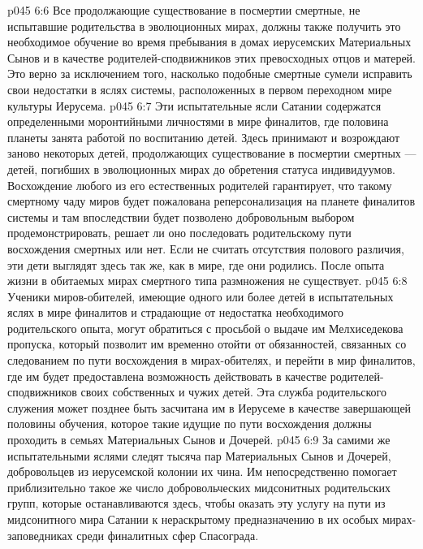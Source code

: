 \vs p045 6:6 Все продолжающие существование в посмертии смертные, не испытавшие родительства в эволюционных мирах, должны также получить это необходимое обучение во время пребывания в домах иерусемских Материальных Сынов и в качестве родителей\hyp{}сподвижников этих превосходных отцов и матерей. Это верно за исключением того, насколько подобные смертные сумели исправить свои недостатки в яслях системы, расположенных в первом переходном мире культуры Иерусема.
\vs p045 6:7 \pc Эти испытательные ясли Сатании содержатся определенными моронтийными личностями в мире финалитов, где половина планеты занята работой по воспитанию детей. Здесь принимают и возрождают заново некоторых детей, продолжающих существование в посмертии смертных --- детей, погибших в эволюционных мирах до обретения статуса индивидуумов. Восхождение любого из его естественных родителей гарантирует, что такому смертному чаду миров будет пожалована реперсонализация на планете финалитов системы и там впоследствии будет позволено добровольным выбором продемонстрировать, решает ли оно последовать родительскому пути восхождения смертных или нет. Если не считать отсутствия полового различия, эти дети выглядят здесь так же, как в мире, где они родились. После опыта жизни в обитаемых мирах смертного типа размножения не существует.
\vs p045 6:8 Ученики миров\hyp{}обителей, имеющие одного или более детей в испытательных яслях в мире финалитов и страдающие от недостатка необходимого родительского опыта, могут обратиться с просьбой о выдаче им Мелхиседекова пропуска, который позволит им временно отойти от обязанностей, связанных со следованием по пути восхождения в мирах\hyp{}обителях, и перейти в мир финалитов, где им будет предоставлена возможность действовать в качестве родителей\hyp{}сподвижников своих собственных и чужих детей. Эта служба родительского служения может позднее быть засчитана им в Иерусеме в качестве завершающей половины обучения, которое такие идущие по пути восхождения должны проходить в семьях Материальных Сынов и Дочерей.
\vs p045 6:9 За самими же испытательными яслями следят тысяча пар Материальных Сынов и Дочерей, добровольцев из иерусемской колонии их чина. Им непосредственно помогает приблизительно такое же число добровольческих мидсонитных родительских групп, которые останавливаются здесь, чтобы оказать эту услугу на пути из мидсонитного мира Сатании к нераскрытому предназначению в их особых мирах\hyp{}заповедниках среди финалитных сфер Спасограда.
